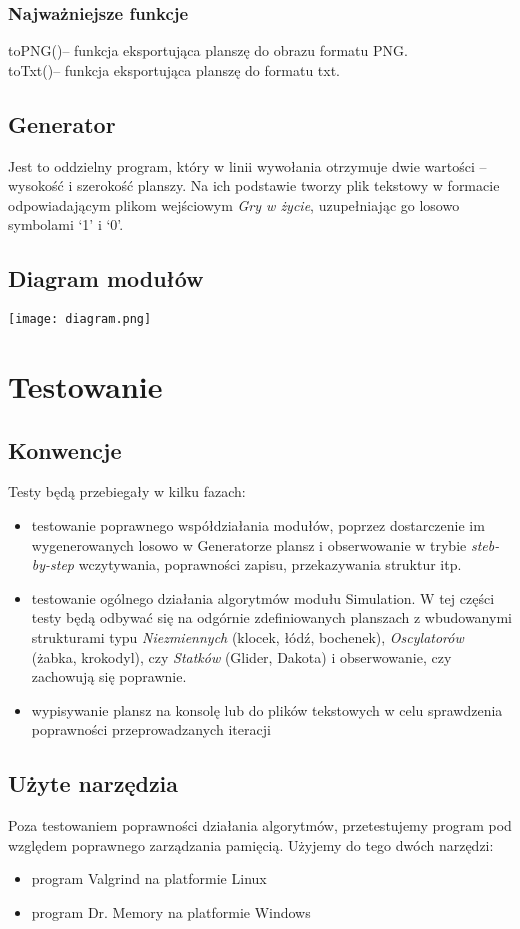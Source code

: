 \documentclass{article}
\begin{document}
\subsubsection{Najważniejsze funkcje}
{\selectfont toPNG()}-- funkcja eksportująca planszę do obrazu formatu PNG.\\
{\selectfont toTxt()}-- funkcja eksportująca planszę do formatu txt.

\subsection{Generator}
Jest to oddzielny program, który w linii wywołania otrzymuje dwie wartości -- wysokość i szerokość
planszy. Na ich podstawie tworzy plik tekstowy w formacie odpowiadającym plikom wejściowym
\textit{Gry w życie}, uzupełniając go losowo symbolami `1' i `0'.

\subsection{Diagram modułów}
\begin{center}
  \texttt{[image: diagram.png]}
\end{center}

\newpage
\section{Testowanie}
\subsection{Konwencje}
Testy będą przebiegały w kilku fazach:
\begin{itemize}
  \item testowanie poprawnego współdziałania modułów, poprzez dostarczenie im wygenerowanych
    losowo w Generatorze plansz i obserwowanie w trybie \textit{steb-by-step} wczytywania,
    poprawności zapisu, przekazywania struktur itp.
  \item testowanie ogólnego działania algorytmów modułu Simulation. W tej części testy będą odbywać
    się na odgórnie zdefiniowanych planszach z wbudowanymi strukturami typu \textit{Niezmiennych}
    (klocek, łódź, bochenek), \textit{Oscylatorów} (żabka, krokodyl), czy \textit{Statków} (Glider,
    Dakota) i obserwowanie, czy zachowują się poprawnie.
  \item wypisywanie plansz na konsolę lub do plików tekstowych w celu sprawdzenia poprawności
    przeprowadzanych iteracji
\end{itemize}
\subsection{Użyte narzędzia}
Poza testowaniem poprawności działania algorytmów, przetestujemy program pod względem poprawnego
zarządzania pamięcią. Użyjemy do tego dwóch narzędzi:
\begin{itemize}
  \item program Valgrind na platformie Linux
  \item program Dr. Memory na platformie Windows
\end{itemize}
\end{document}

